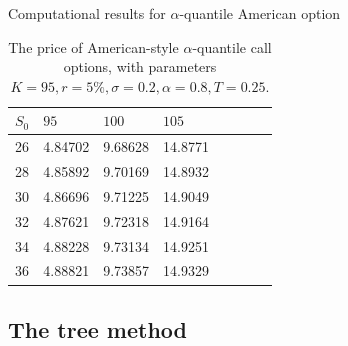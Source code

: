 \documentclass[cjk]{beamer}
\begin{document}
\begin{frame}{Computational results for $\alpha$-quantile American option}
\begin{table}
\caption{The price of American-style $\alpha$-quantile call options, with parameters
	$K=95, r=5\%, \sigma=0.2, \alpha=0.8, T=0.25$. 
	}
\begin{center}
\begin{tabular}{l|lllllll}
$S_0$ & $95$ & $100$ & $105$        \\
\hline
26 & 4.84702 &  9.68628 & 14.8771\\
28 & 4.85892 &  9.70169 & 14.8932\\
30 & 4.86696 &  9.71225 & 14.9049\\
32 & 4.87621 &  9.72318 & 14.9164\\
34 & 4.88228 &  9.73134 & 14.9251\\
36 & 4.88821 &  9.73857 & 14.9329\\
\end{tabular}
\end{center}
\label{fig:amer8}
\end{table}
\end{frame}

\subsection{The tree method}
\end{document}
